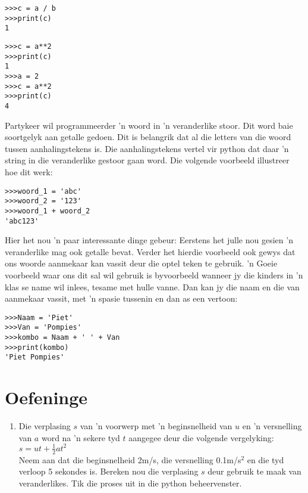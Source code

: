 \begin{lstlisting}[style=DOS]
>>>c = a / b
>>>print(c)
1
\end{lstlisting}


\begin{lstlisting}[style=DOS]
>>>c = a**2
>>>print(c)
1
>>>a = 2
>>>c = a**2
>>>print(c)
4
\end{lstlisting}


Partykeer wil programmeerder 'n woord in 'n veranderlike stoor.  Dit word baie soortgelyk aan getalle gedoen.  Dit is belangrik dat al die letters van die woord tussen aanhalingstekens is.  Die aanhalingstekens vertel vir python dat daar 'n string in die veranderlike gestoor gaan word.  Die volgende voorbeeld illustreer hoe dit werk:

\begin{lstlisting}[style=DOS]
>>>woord_1 = 'abc'
>>>woord_2 = '123'
>>>woord_1 + woord_2
'abc123'
\end{lstlisting}

Hier het nou 'n paar interessante dinge gebeur:  Eerstens het julle nou gesien 'n veranderlike mag ook getalle bevat.  Verder het hierdie voorbeeld ook gewys dat ons woorde aanmekaar kan vassit deur die optel teken te gebruik.  'n Goeie voorbeeld waar ons dit sal wil gebruik is byvoorbeeld wanneer jy die kinders in 'n klas se name wil inlees, tesame met hulle vanne.  Dan kan jy die naam en die van aanmekaar vassit, met 'n spasie tussenin en dan as een vertoon:

\begin{lstlisting}[style=DOS]
>>>Naam = 'Piet'
>>>Van = 'Pompies'
>>>kombo = Naam + ' ' + Van
>>>print(kombo)
'Piet Pompies'
\end{lstlisting}


\section{Oefeninge}

\begin{enumerate}
\item Die verplasing $s$ van 'n voorwerp met 'n beginsnelheid van $u$ en 'n versnelling van $a$ word na 'n sekere tyd $t$ aangegee deur die volgende vergelyking: \\
$s = ut + \frac{1}{2}at^2$ \\
Neem aan dat die beginsnelheid 2m/s, die versnelling 0.1m/s$^2$ en die tyd verloop 5 sekondes is.  Bereken nou die verplasing $s$ deur gebruik te maak van veranderlikes.  Tik die proses uit in die python beheervenster.
\end{enumerate}


